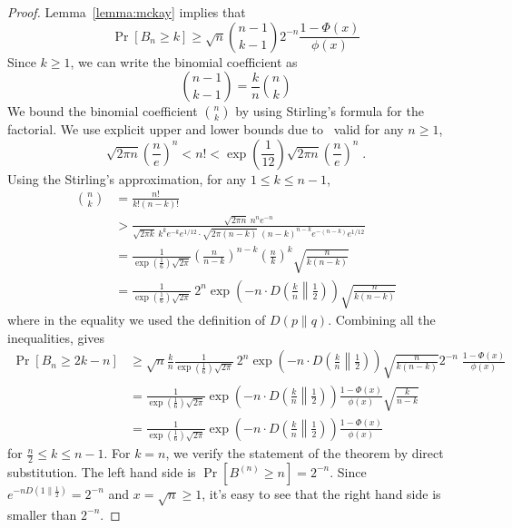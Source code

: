 \documentclass{article}
\begin{document}
\begin{proof}
Lemma~\ref{lemma:mckay} implies that
$$
\Pr \left[ B_n \ge k \right] \ge \sqrt{n} \binom{n-1}{k-1} 2^{-n} \frac{1 - \Phi(x)}{\phi(x)}
$$
Since $k \ge 1$, we can write the binomial coefficient as
$$
\binom{n-1}{k-1} = \frac{k}{n} \binom{n}{k}
$$
We bound the binomial coefficient $\binom{n}{k}$ by using Stirling's formula for the factorial.
We use explicit upper and lower bounds due to~\cite{Robbins-1955} valid for any $n\ge 1$,
$$
\sqrt{2 \pi n} \left( \frac{n}{e} \right)^n < n! < \exp\left(\frac{1}{12}\right) \sqrt{2 \pi n} \left( \frac{n}{e} \right)^n \; .
$$
Using the Stirling's approximation, for any $1\le k \le n-1$,
\begin{align*}
\binom{n}{k}
& = \frac{n!}{k! (n-k)!} \\
& > \frac{\sqrt{2\pi n} \ n^n e^{-n}}{\sqrt{2\pi k} \ k^k e^{-k} e^{1/12} \cdot \sqrt{2\pi (n-k)} \ (n-k)^{n-k} e^{-(n-k)} e^{1/12}} \\
& = \frac{1}{\exp\left(\frac{1}{6}\right) \sqrt{2 \pi}} \left(\frac{n}{n-k}\right)^{n-k} \left(\frac{n}{k}\right)^k \sqrt{\frac{n}{k(n-k)}} \\
& = \frac{1}{\exp\left(\frac{1}{6}\right) \sqrt{2 \pi}} \ 2^n \exp\left(-n \cdot D\left(\frac{k}{n} \middle\| \frac{1}{2}\right)\right) \sqrt{\frac{n}{k(n-k)}}
\end{align*}
where in the equality we used the definition of $D(p\|q)$. Combining all the inequalities, gives
\begin{align*}
\Pr \left[ B_n \ge 2k - n \right]
& \ge \sqrt{n} \frac{k}{n} \frac{1}{\exp\left(\frac{1}{6}\right) \sqrt{2 \pi}} \ 2^n \exp\left(-n \cdot D\left(\frac{k}{n} \middle\| \frac{1}{2}\right)\right) \sqrt{\frac{n}{k(n-k)}} 2^{-n} \; \frac{1 - \Phi(x)}{\phi(x)} \\
& = \frac{1}{\exp\left(\frac{1}{6}\right) \sqrt{2\pi}} \exp\left(-n \cdot D\left(\frac{k}{n} \middle\| \frac{1}{2}\right)\right) \frac{1 - \Phi(x)}{\phi(x)} \sqrt{\frac{k}{n-k}} \\
& = \frac{1}{\exp\left(\frac{1}{6}\right) \sqrt{2\pi}} \exp\left(-n \cdot D\left(\frac{k}{n} \middle\| \frac{1}{2}\right)\right) \frac{1 - \Phi(x)}{\phi(x)}
\end{align*}
for $\frac{n}{2} \le k \le n - 1$. For $k=n$, we verify the statement of the theorem by direct substitution. The left hand side is $\Pr[B^{(n)} \ge n] = 2^{-n}$.
Since $e^{-nD(1\|\frac{1}{2})} = 2^{-n}$ and $x=\sqrt{n} \ge 1$, it's easy to see that the right hand side is smaller than $2^{-n}$.
\end{proof}
\end{document}
